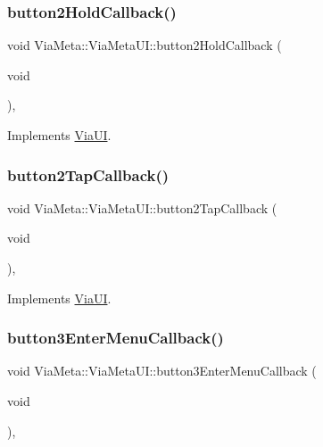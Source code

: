 \subsubsection{\texorpdfstring{button2\+Hold\+Callback()}{button2HoldCallback()}}
{\footnotesize\ttfamily void Via\+Meta\+::\+Via\+Meta\+U\+I\+::button2\+Hold\+Callback (\begin{DoxyParamCaption}\item[{void}]{ }\end{DoxyParamCaption})\hspace{0.3cm}{\ttfamily [override]}, {\ttfamily [virtual]}}



Implements \mbox{\hyperlink{class_via_u_i_a95bce2d662a8ae46be73497e868aebb9}{Via\+UI}}.

\mbox{\label{class_via_meta_1_1_via_meta_u_i_a3d9aa9b0cc62a32b79541e25bbec6bd5}} 
\subsubsection{\texorpdfstring{button2\+Tap\+Callback()}{button2TapCallback()}}
{\footnotesize\ttfamily void Via\+Meta\+::\+Via\+Meta\+U\+I\+::button2\+Tap\+Callback (\begin{DoxyParamCaption}\item[{void}]{ }\end{DoxyParamCaption})\hspace{0.3cm}{\ttfamily [override]}, {\ttfamily [virtual]}}



Implements \mbox{\hyperlink{class_via_u_i_a8fce17e375ea6fe3a4746bff3e6dec75}{Via\+UI}}.

\mbox{\label{class_via_meta_1_1_via_meta_u_i_abff70e527b92121c207699c8c8334ee6}} 
\subsubsection{\texorpdfstring{button3\+Enter\+Menu\+Callback()}{button3EnterMenuCallback()}}
{\footnotesize\ttfamily void Via\+Meta\+::\+Via\+Meta\+U\+I\+::button3\+Enter\+Menu\+Callback (\begin{DoxyParamCaption}\item[{void}]{ }\end{DoxyParamCaption})\hspace{0.3cm}{\ttfamily [override]}, {\ttfamily [virtual]}}



